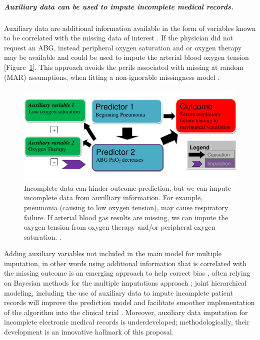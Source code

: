 \documentclass[11pt,notitlepage]{article}
\begin{document}
\subparagraph*{Auxiliary data can be used to impute incomplete medical records.} Auxiliary data are additional information available in the form of variables known to be correlated with the missing data of interest \cite{Daniels24571539}. If the physician did not request an ABG, instead peripheral oxygen saturation and or oxygen therapy may be available and could be used to impute the arterial blood oxygen tension [Figure~\ref{fig:Imputation_fig}]. This approach avoids the perils associated with missing at random (MAR) assumptions, when fitting a non-ignorable missingness model \cite{Wang_20029935}.

\begin{figure} 
 \vspace{-30pt}
 \includegraphics[scale=0.4]{Figures/Bayesian_imputation.pdf}
    \vspace{-20pt}
  \caption{\footnotesize Incomplete data can hinder outcome prediction, but we can impute incomplete data from auxilliary information. For example, pneumonia (causing to low oxygen tension), may cause respiratory failure. If arterial blood gas results are missing, we can impute the oxygen tension from oxygen therapy and/or peripheral oxygen saturation.  \cite{Hall_25389642}.}
   \vspace{-20pt}
    \label{fig:Imputation_fig}
\end{figure}

Adding auxiliary variables not included in the main model for multiple imputation, in other words using additional information that is correlated with the missing outcome is an emerging approach to help correct bias \cite{Meng_1994, Collins_11778676, Rubin_1996}, often relying on Bayesian methods for the multiple imputations approach \cite{Daniels_2008, Schafer_1997}; joint hierarchical modeling, including the use of auxiliary data to impute incomplete patient records will improve the prediction model and facilitate smoother implementation of the algorithm into the clinical trial \cite{Hall_25389642}. Moreover, auxiliary data imputation for incomplete electronic medical records is underdeveloped; methodologically, their development is an innovative hallmark of this proposal.\newline
\end{document}
